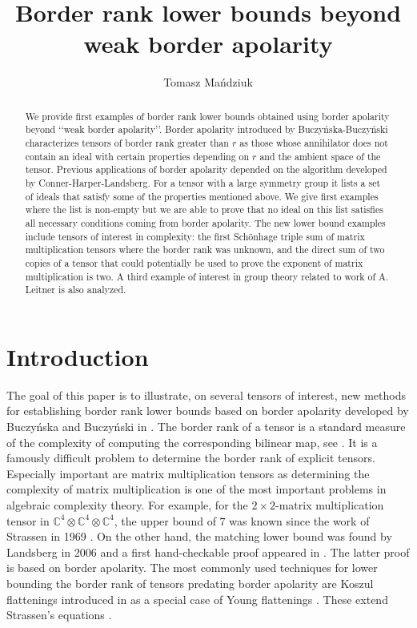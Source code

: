 \documentclass[12pt]{amsart}
\date{}
\title{Border rank lower bounds beyond weak border apolarity}
\date{}
\author{Tomasz Ma\'ndziuk}
\theoremstyle{definition}
\theoremstyle{remark}
\theoremstyle{definition}
\newcommand{\CC}{\mathbb{C}}
\begin{document}
	
	\begin{abstract}
    We provide first examples of border rank lower bounds obtained using border apolarity beyond   \lq\lq weak border apolarity\rq\rq. 
    Border apolarity introduced by Buczy\'nska-Buczy\'nski characterizes tensors of border rank greater than $r$ as those whose annihilator does not contain an ideal with certain properties depending on $r$ and the ambient space of the tensor. Previous applications of border apolarity depended on the algorithm developed by Conner-Harper-Landsberg. For a tensor with a large symmetry group it lists a set of ideals that satisfy some of the properties mentioned above. We give first examples where the list is non-empty but we are able to prove that no ideal on this list satisfies all necessary conditions coming from border apolarity.
    The new lower bound examples include tensors of interest in complexity:
the first Sch\"onhage triple sum of matrix multiplication tensors where the border
rank was unknown,  and the direct sum of two copies of a tensor that could potentially be used
to prove the exponent of matrix multiplication is two.  A third  example of
interest in  group theory related to work of A. Leitner is also analyzed. \end{abstract}

    
    \maketitle


\section{Introduction}
The goal of this paper is to illustrate, on several tensors of interest, new methods for establishing border rank lower bounds based on border apolarity developed by Buczy\'nska and Buczy\'nski in \cite{BB19}. 
The border rank of a tensor is a standard measure of the complexity of computing the corresponding bilinear map,
see \cite[Chaps. 14-15]{BCS}.
It is a famously difficult problem to determine the border rank of explicit tensors. Especially important are matrix multiplication
tensors as determining the complexity of matrix multiplication is one of the most important problems in algebraic complexity theory.
 For example, for the $2\times 2$-matrix multiplication tensor in $\CC^4\otimes \CC^4 \otimes \CC^4$, the upper bound of $7$ was known since the work of Strassen in 1969 \cite{Str69}. On the other hand, the matching lower bound was found by Landsberg in 2006 \cite{Lan06} and a first hand-checkable proof appeared in \cite{chl19}. The latter proof is based on border apolarity. The most commonly used techniques for lower bounding the border rank of tensors predating border apolarity are Koszul flattenings introduced in \cite{LO15} as a special case of Young flattenings \cite{LO11}. These extend Strassen's equations \cite{Str83}.
\end{document}
